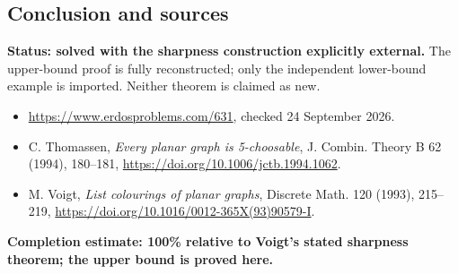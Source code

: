 \subsection*{Conclusion and sources}
\textbf{Status: solved with the sharpness construction explicitly external.} The upper-bound proof is fully reconstructed; only the independent lower-bound example is imported. Neither theorem is claimed as new.
\begin{itemize}
\item \url{https://www.erdosproblems.com/631}, checked 24 September 2026.
\item C. Thomassen, \emph{Every planar graph is 5-choosable}, J. Combin. Theory B 62 (1994), 180--181, \url{https://doi.org/10.1006/jctb.1994.1062}.
\item M. Voigt, \emph{List colourings of planar graphs}, Discrete Math. 120 (1993), 215--219, \url{https://doi.org/10.1016/0012-365X(93)90579-I}.
\end{itemize}
\noindent\textbf{Completion estimate: 100\% relative to Voigt's stated sharpness theorem; the upper bound is proved here.}
